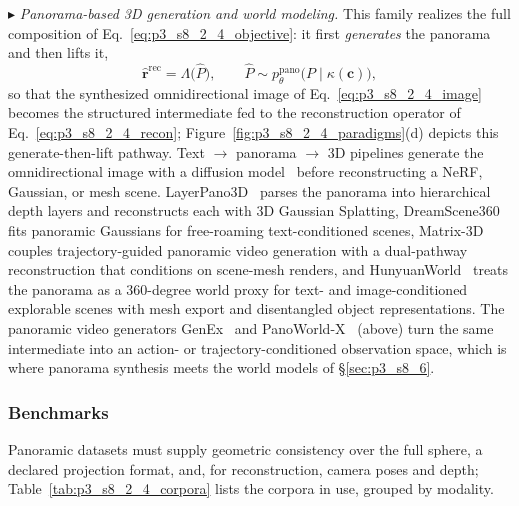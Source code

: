 $\blacktriangleright$ \textit{Panorama-based 3D generation and world modeling.} This family realizes the full composition of Eq.~\eqref{eq:p3_s8_2_4_objective}: it first \emph{generates} the panorama and then lifts it,
\begin{equation}
\hat{\mathbf{r}}^{\text{rec}} = \Lambda\big(\hat{P}\big),
\qquad
\hat{P} \sim p_\theta^{\text{pano}}\!\big(P \mid \kappa(\mathbf{c})\big),
\label{eq:p3_s8_2_4_gen}
\end{equation}
so that the synthesized omnidirectional image of Eq.~\eqref{eq:p3_s8_2_4_image} becomes the structured intermediate fed to the reconstruction operator of Eq.~\eqref{eq:p3_s8_2_4_recon}; Figure~\ref{fig:p3_s8_2_4_paradigms}(d) depicts this generate-then-lift pathway.
Text $\rightarrow$ panorama $\rightarrow$ 3D pipelines generate the omnidirectional image with a diffusion model~\cite{ye2024diffpano,kalischek2025cubediff} before reconstructing a NeRF, Gaussian, or mesh scene.
LayerPano3D~\cite{yang2024layerpano3d} parses the panorama into hierarchical depth layers and reconstructs each with 3D Gaussian Splatting, DreamScene360~\cite{zhou2025dreamscene360} fits panoramic Gaussians for free-roaming text-conditioned scenes, Matrix-3D~\cite{yang2025matrix} couples trajectory-guided panoramic video generation with a dual-pathway reconstruction that conditions on scene-mesh renders, and HunyuanWorld~\cite{team2025hunyuanworld} treats the panorama as a 360-degree world proxy for text- and image-conditioned explorable scenes with mesh export and disentangled object representations.
The panoramic video generators GenEx~\cite{lu2024genex} and PanoWorld-X~\cite{yin2025panoworld} (above) turn the same intermediate into an action- or trajectory-conditioned observation space, which is where panorama synthesis meets the world models of §\ref{sec:p3_s8_6}.


\subsubsection{Benchmarks}
\label{subsubsec:p3_s8_2_4_benchmarks}

Panoramic datasets must supply geometric consistency over the full sphere, a declared projection format, and, for reconstruction, camera poses and depth; Table~\ref{tab:p3_s8_2_4_corpora} lists the corpora in use, grouped by modality.


